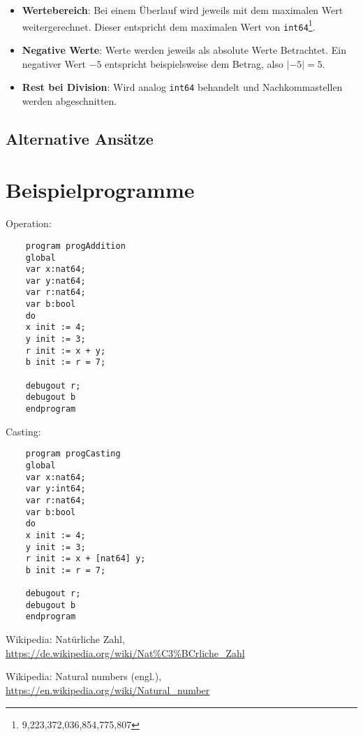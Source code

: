 \documentclass[10pt, a4paper, twocolumn]{article} %
\begin{document}
\begin{itemize} %
    \item \textbf{Wertebereich}: Bei einem Überlauf wird jeweils mit dem maximalen Wert weitergerechnet. Dieser entspricht dem maximalen Wert von \texttt{int64}\footnote{9,223,372,036,854,775,807}.
    \item \textbf{Negative Werte}: Werte werden jeweils als absolute Werte Betrachtet. Ein negativer Wert $-5$ entspricht beispielsweise dem Betrag, also $|-5| = 5$.
    \item \textbf{Rest bei Division}: Wird analog \texttt{int64} behandelt und Nachkommastellen werden abgeschnitten.
\end{itemize}

\subsection{Alternative Ansätze}


\section{Beispielprogramme}
\label{sec:prog}
Operation:
\begin{lstlisting}
    program progAddition
    global
    var x:nat64;
    var y:nat64;
    var r:nat64;
    var b:bool
    do
    x init := 4;
    y init := 3;
    r init := x + y;
    b init := r = 7;

    debugout r;
    debugout b
    endprogram
\end{lstlisting}
Casting:
\begin{lstlisting}
    program progCasting
    global
    var x:nat64;
    var y:int64;
    var r:nat64;
    var b:bool
    do
    x init := 4;
    y init := 3;
    r init := x + [nat64] y;
    b init := r = 7;

    debugout r;
    debugout b
    endprogram
\end{lstlisting}


\begin{thebibliography}{9}
    Wikipedia: Natürliche Zahl,
    \url{https://de.wikipedia.org/wiki/Nat\%C3\%BCrliche_Zahl}

    Wikipedia: Natural numbers (engl.),
    \url{https://en.wikipedia.org/wiki/Natural_number}
\end{thebibliography}
\end{document}
